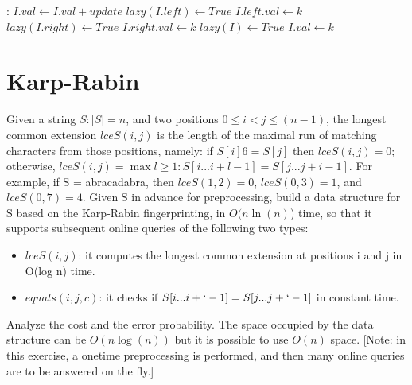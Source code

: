 \documentclass{article}
\begin{document}
\begin{algorithmic}[1]
  :
                                       
        \State \Return $I.val \gets I.val + update$\;
    \EndIf
         
        \State $lazy(I.left) \gets True$
        \State $I.left.val \gets k$
    \EndIf
     
        \State $lazy(I.right) \gets True$
        \State $I.right.val \gets k$
    \EndIf
          
        \State $lazy(I) \gets True$
        \State $I.val \gets k$
    \EndIf
                            
        \State {}
    \EndIf
                           
        \State {}
    \EndIf

    \State {}         
        \State {}
    \EndIf
    \EndFunction
\end{algorithmic}


\newpage
\section{Karp-Rabin}
Given a string $S: |S| = n$, and two positions $0 \leq i < j \leq (n - 1)$,
the longest common extension $lceS(i, j)$ is the length of the maximal run of matching
characters from those positions, namely: if $S[i] 6= S[j]$ then $lceS(i, j) = 0$;
otherwise, $lceS(i, j) = \max{l \geq 1 : S[i ... i + l - 1] = S[j ... j + i - 1]}$.
For example, if S = abracadabra, then $lceS(1, 2) = 0$, $lceS(0, 3) = 1$, and
$lceS(0, 7) = 4$.
Given S in advance for preprocessing, build a data structure for S based
on the Karp-Rabin fingerprinting, in $O(n \ln(n)$) time, so that it supports subsequent
online queries of the following two types:
\begin{itemize}
    \item $lceS(i, j)$: it computes the longest common extension at positions i
    and j in O(log n) time.
    \item $equals (i, j, c)$: it checks if $S[i ... i + ` - 1] = S[j ... j + ` - 1]$ in constant time.
\end{itemize}
Analyze the cost and the error probability.
The space occupied by the data structure can be $O(n \log(n))$ but it is possible
to use $O(n)$ space.
[Note: in this exercise, a onetime preprocessing is performed, and then many online
queries are to be answered on the fly.]
\end{document}
